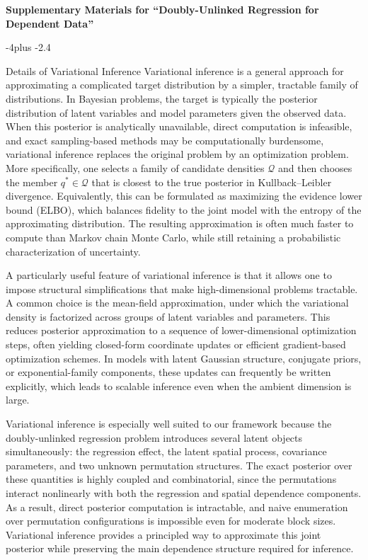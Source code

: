 \documentclass[numsec,webpdf,modern,medium,namedate]{oup-authoring-template}
\makeatletter
\theoremstyle{thmstyleone}%
\theoremstyle{thmstyletwo}%
\theoremstyle{thmstylethree}%
\def\section{%
  \@startsection{section}{1}{\z@}
  {-4\p@ plus -2\p@}{\if@traditional\if@large.4\p@\else\if@medium6.5\p@\else4\p@\fi\fi\else\if@contemporary5\p@\else4\p@\fi\fi}
  {\reset@font\raggedright\secsize}}
\makeatother
\begin{document}
\label{supplementary-material}
\bigskip
\begin{center}
{\large\bf Supplementary Materials for ``Doubly-Unlinked Regression for Dependent Data''}
\end{center}

\section{Details of Variational Inference}
Variational inference is a general approach for approximating a complicated target distribution by a simpler, tractable family of distributions. In Bayesian problems, the target is typically the posterior distribution of latent variables and model parameters given the observed data. When this posterior is analytically unavailable, direct computation is infeasible, and exact sampling-based methods may be computationally burdensome, variational inference replaces the original problem by an optimization problem. More specifically, one selects a family of candidate densities $\mathcal{Q}$ and then chooses the member $q^\ast \in \mathcal{Q}$ that is closest to the true posterior in Kullback--Leibler divergence. Equivalently, this can be formulated as maximizing the evidence lower bound (ELBO), which balances fidelity to the joint model with the entropy of the approximating distribution. The resulting approximation is often much faster to compute than Markov chain Monte Carlo, while still retaining a probabilistic characterization of uncertainty.

A particularly useful feature of variational inference is that it allows one to impose structural simplifications that make high-dimensional problems tractable. A common choice is the mean-field approximation, under which the variational density is factorized across groups of latent variables and parameters. This reduces posterior approximation to a sequence of lower-dimensional optimization steps, often yielding closed-form coordinate updates or efficient gradient-based optimization schemes. In models with latent Gaussian structure, conjugate priors, or exponential-family components, these updates can frequently be written explicitly, which leads to scalable inference even when the ambient dimension is large.

Variational inference is especially well suited to our framework because the doubly-unlinked regression problem introduces several latent objects simultaneously: the regression effect, the latent spatial process, covariance parameters, and two unknown permutation structures. The exact posterior over these quantities is highly coupled and combinatorial, since the permutations interact nonlinearly with both the regression and spatial dependence components. As a result, direct posterior computation is intractable, and naive enumeration over permutation configurations is impossible even for moderate block sizes. Variational inference provides a principled way to approximate this joint posterior while preserving the main dependence structure required for inference.
\end{document}
